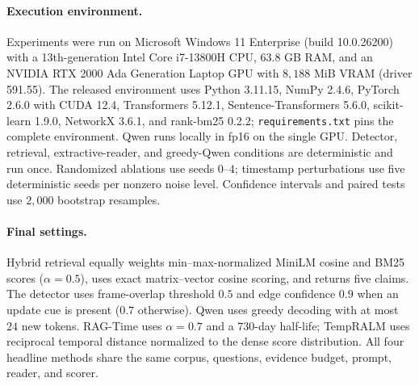 \documentclass[letterpaper]{article}
\begin{document}
\paragraph{Execution environment.} Experiments were run on Microsoft Windows 11 Enterprise (build 10.0.26200) with a 13th-generation Intel Core i7-13800H CPU, $63.8$ GB RAM, and an NVIDIA RTX 2000 Ada Generation Laptop GPU with $8{,}188$ MiB VRAM (driver 591.55). The released environment uses Python 3.11.15, NumPy 2.4.6, PyTorch 2.6.0 with CUDA 12.4, Transformers 5.12.1, Sentence-Transformers 5.6.0, scikit-learn 1.9.0, NetworkX 3.6.1, and rank-bm25 0.2.2; \texttt{requirements.txt} pins the complete environment. Qwen runs locally in fp16 on the single GPU. Detector, retrieval, extractive-reader, and greedy-Qwen conditions are deterministic and run once. Randomized ablations use seeds $0$--$4$; timestamp perturbations use five deterministic seeds per nonzero noise level. Confidence intervals and paired tests use $2{,}000$ bootstrap resamples.

\paragraph{Final settings.} Hybrid retrieval equally weights min--max-normalized MiniLM cosine and BM25 scores ($\alpha{=}0.5$), uses exact matrix--vector cosine scoring, and returns five claims. The detector uses frame-overlap threshold $0.5$ and edge confidence $0.9$ when an update cue is present ($0.7$ otherwise). Qwen uses greedy decoding with at most $24$ new tokens. RAG-Time uses $\alpha{=}0.7$ and a $730$-day half-life; TempRALM uses reciprocal temporal distance normalized to the dense score distribution. All four headline methods share the same corpus, questions, evidence budget, prompt, reader, and scorer.


\end{document}

